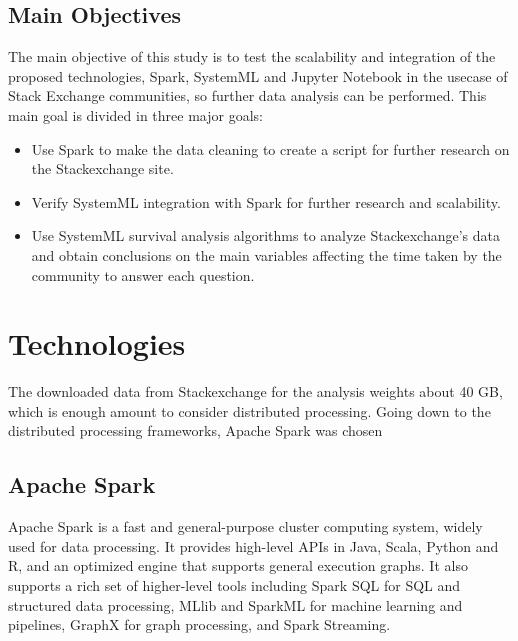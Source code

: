 \documentclass[11pt]{article} %
\begin{document}
  \subsection{Main Objectives}

    The main objective of this study is to test the scalability and integration of the proposed technologies, Spark, SystemML and Jupyter Notebook in the usecase of Stack Exchange communities, so further data analysis can be performed. This main goal is divided in three major goals:

    \begin{itemize}

      \item Use Spark to make the data cleaning to create a script for further research on the Stackexchange site.

      \item Verify SystemML integration with Spark for further research and scalability.

      \item Use SystemML survival analysis algorithms to analyze Stackexchange's data and obtain conclusions on the main variables affecting the time taken by the community to answer each question.

    \end{itemize}

\newpage

\section{Technologies}
  \label{sec:technologies}

  The downloaded data from Stackexchange for the analysis weights about 40 GB, which is enough amount to consider distributed processing. Going down to the distributed processing frameworks, Apache Spark was chosen

  \subsection{Apache Spark}

    Apache Spark is a fast and general-purpose cluster computing system, widely used for data processing. It provides high-level APIs in Java, Scala, Python and R, and an optimized engine that supports general execution graphs. It also supports a rich set of higher-level tools including Spark SQL for SQL and structured data processing, MLlib and SparkML for machine learning and pipelines, GraphX for graph processing, and Spark Streaming.
\end{document}
